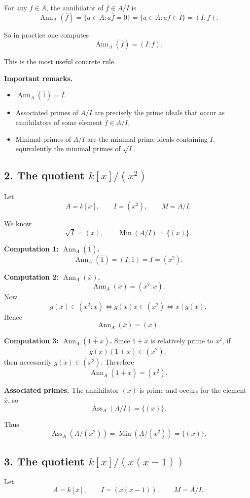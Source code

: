 \documentclass[12pt,a4paper]{article}
\theoremstyle{notespace}
\DeclareMathOperator{\Ass}{Ass}
\DeclareMathOperator{\Ann}{Ann}
\DeclareMathOperator{\Min}{Min}
\begin{document}
For any \(f\in A\), the annihilator of \(\overline f\in A/I\) is
\[
\Ann_A(\overline f)=\{a\in A:a\overline f=0\}
=\{a\in A:af\in I\}
=(I:f).
\]

So in practice one computes
\[
\Ann_A(\overline f)=(I:f).
\]

This is the most useful concrete rule.

\medskip

\textbf{Important remarks.}
\begin{itemize}
	\item \(\Ann_A(\overline 1)=I\).
	\item Associated primes of \(A/I\) are precisely the prime ideals that occur as annihilators of some element \(\overline f\in A/I\).
	\item Minimal primes of \(A/I\) are the minimal prime ideals containing \(I\), equivalently the minimal primes of \(\sqrt I\).
\end{itemize}

\subsection{2. The quotient \(k[x]/(x^2)\)}

Let
\[
A=k[x],\qquad I=(x^2),\qquad M=A/I.
\]

We know
\[
\sqrt I=(x),
\qquad
\Min(A/I)=\{(x)\}.
\]

\textbf{Computation 1: \(\Ann_A(\overline 1)\).}
\[
\Ann_A(\overline 1)=(I:1)=I=(x^2).
\]

\textbf{Computation 2: \(\Ann_A(\overline x)\).}
\[
\Ann_A(\overline x)=(x^2:x).
\]
Now
\[
g(x)\in (x^2:x)
\iff g(x)x\in (x^2)
\iff x\mid g(x).
\]
Hence
\[
\Ann_A(\overline x)=(x).
\]

\textbf{Computation 3: \(\Ann_A(\overline{1+x})\).}
Since \(1+x\) is relatively prime to \(x^2\), if
\[
g(x)(1+x)\in (x^2),
\]
then necessarily \(g(x)\in (x^2)\). Therefore
\[
\Ann_A(\overline{1+x})=(x^2).
\]

\textbf{Associated primes.}
The annihilator \((x)\) is prime and occurs for the element \(\overline x\), so
\[
\Ass_A(A/I)=\{(x)\}.
\]

Thus
\[
\Ass_A(A/(x^2))=\Min(A/(x^2))=\{(x)\}.
\]

\subsection{3. The quotient \(k[x]/(x(x-1))\)}

Let
\[
A=k[x],\qquad I=(x(x-1)),\qquad M=A/I.
\]
\end{document}
